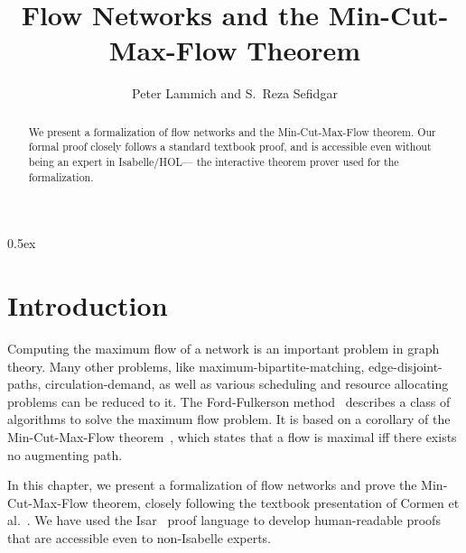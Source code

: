 \documentclass[11pt,a4paper]{article}
\begin{document}
\title{Flow Networks and the Min-Cut-Max-Flow Theorem}
\author{Peter Lammich and S.~Reza Sefidgar}
\maketitle

\begin{abstract}
We present a formalization of flow networks and the Min-Cut-Max-Flow theorem.
Our formal proof closely follows a standard textbook proof, and is accessible even without being
an expert in Isabelle/HOL--- the interactive theorem prover used for the formalization.
\end{abstract}

\clearpage
\tableofcontents

\clearpage

\parindent 0pt\parskip 0.5ex

\section{Introduction}
Computing the maximum flow of a network is an important problem in graph theory.
Many other problems, like maximum-bipartite-matching, edge-disjoint-paths,
circulation-demand, as well as various scheduling and resource allocating
problems can be reduced to it. The Ford-Fulkerson method~\cite{FF56} describes a
class of algorithms to solve the maximum flow problem. 
It is based on a corollary of the Min-Cut-Max-Flow theorem~\cite{FF56,EFS56}, which states that a flow 
is maximal iff there exists no augmenting path. 

In this chapter, we present a formalization of flow networks and prove the Min-Cut-Max-Flow theorem,
closely following the textbook presentation of Cormen et al.~\cite{CLRS09}.
We have used the
Isar~\cite{Wenzel99} proof language to develop human-readable proofs that are 
accessible even to non-Isabelle experts.





\end{document}
